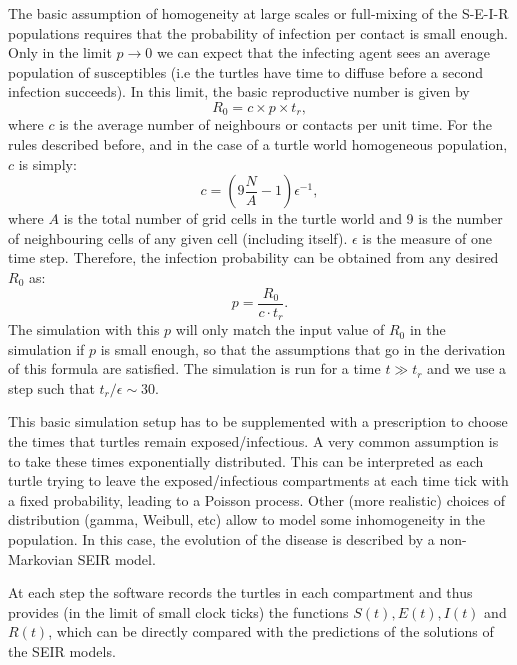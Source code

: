 \documentclass[10pt,letterpaper]{article}
\begin{document}
The basic assumption of homogeneity at large scales or full-mixing of the 
S-E-I-R populations requires that the probability of infection per contact is small enough. Only in the limit 
$p\rightarrow 0$ we can expect that the infecting agent sees an average population of susceptibles (i.e 
the turtles have time to diffuse before a second infection succeeds). In this limit, the basic reproductive
 number  is given by 
\begin{equation}
R_0 = c \times p \times t_r ,
\label{eq:r0cptr}
\end{equation}
where $c$ is the average number of neighbours or contacts per unit time.  For the rules described before, and in the case of a turtle world homogeneous population, $c$ is simply:
\begin{equation}
{c} = \left(9 \frac{N}{A}-1 \right) \epsilon^{-1},
\end{equation}
where $A$ is the total number of grid cells in the turtle world and 9 is the number of  neighbouring cells of any given cell (including itself). $\epsilon$ is the measure of one time step. Therefore, the infection probability can be obtained from any desired $R_0$  as:
\begin{equation}
p = \frac{R_0}{c \cdot t_r}.
\end{equation}
The simulation with this $p$ will only match the input value of $R_0$ in the simulation if $p$ is small enough, so that the assumptions that go in the derivation of this formula are satisfied. The simulation is run for a time $t \gg t_r$ and we use a step such that $t_r/\epsilon \sim 30$.

This basic simulation setup has to be supplemented with a prescription
to choose the times that turtles remain exposed/infectious. 
A very common assumption is to take these times exponentially
distributed. This can be interpreted as each turtle trying to leave the
exposed/infectious compartments at each time tick with a fixed
probability, leading to a Poisson process. 
Other (more realistic) choices of distribution (gamma, Weibull,
etc) allow to model some inhomogeneity in the population.
In this case, the evolution of the disease is described by a 
non-Markovian SEIR model. 

 
 At each step the software records the turtles in each compartment and thus provides (in the limit of small clock ticks) the functions $S(t), E(t), I(t)$ and $R(t)$, which can be directly compared with the predictions of the solutions of the SEIR models.
\end{document}
